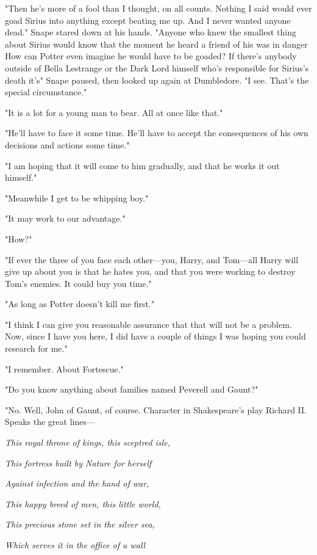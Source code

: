 "Then he's more of a fool than I thought, on all counts. Nothing I said would ever goad Sirius into anything except beating me up. And I never wanted anyone dead." Snape stared down at his hands. "Anyone who knew the smallest thing about Sirius would know that the moment he heard a friend of his was in danger{\el} How can Potter even imagine he would have to be goaded? If there's anybody outside of Bella Lestrange or the Dark Lord himself who's responsible for Sirius's death it's{\el}" Snape paused, then looked up again at Dumbledore. "I see. That's the special circumstance."

"It is a lot for a young man to bear. All at once like that."

"He'll have to face it some time. He'll have to accept the consequences of his own decisions and actions some time."

"I am hoping that it will come to him gradually, and that he works it out himself."

"Meanwhile I get to be whipping boy."

"It may work to our advantage."

"How?"

"If ever the three of you face each other—you, Harry, and Tom—all Harry will give up about you is that he hates you, and that you were working to destroy Tom's enemies. It could buy you time."

"As long as Potter doesn't kill me first."

"I think I can give you reasonable assurance that that will not be a problem. Now, since I have you here, I did have a couple of things I was hoping you could research for me."

"I remember. About Fortescue."

"Do you know anything about families named Peverell and Gaunt?"

"No. Well, John of Gaunt, of course. Character in Shakespeare's play Richard II. Speaks the great lines—

\emph{This royal throne of kings, this sceptred isle,}

\emph{{\el}This fortress built by Nature for herself}

\emph{Against infection and the hand of war,}

\emph{This happy breed of men, this little world,}

\emph{This precious stone set in the silver sea,}

\emph{Which serves it in the office of a wall}

